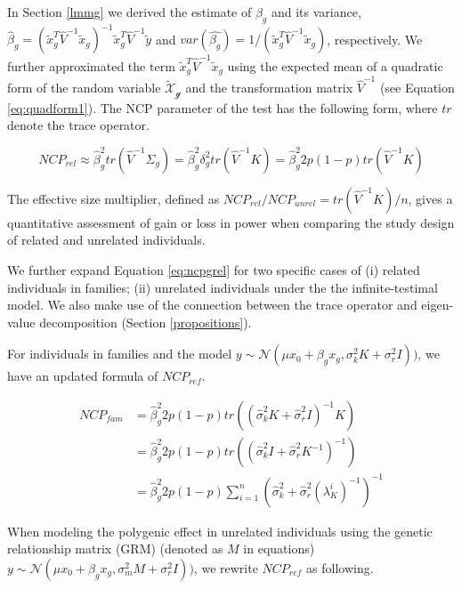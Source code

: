 \documentclass[]{book}
\theoremstyle{definition}
\theoremstyle{definition}
\theoremstyle{definition}
\theoremstyle{remark}
\begin{document}
In Section \ref{lmmg} we derived the estimate of \(\beta_g\) and its
variance,
\(\hat{\beta}_g = (\tilde{x}_g^T \hat{V}^{-1} \tilde{x}_g)^{-1} \tilde{x}_g^T \hat{V}^{-1} \tilde{y}\)
and
\(var(\hat{\beta_g}) = 1 / (\tilde{x}_g^T \hat{V}^{-1} \tilde{x}_g)\),
respectively. We further approximated the term
\(\tilde{x}_g^T \hat{V}^{-1} \tilde{x}_g\) using the expected mean of a
quadratic form of the random variable \(\mathcal{\tilde{X}_g}\) and the
transformation matrix \(\hat{V}^{-1}\) (see Equation
\eqref{eq:quadform1}). The NCP parameter of the test has the following
form, where \(tr\) denote the trace operator.

\begin{equation} 
NCP_{rel} \approx \hat{\beta}_g^2 tr(\hat{V}^{-1} \Sigma_g) = \hat{\beta}_g^2 \delta_g^2 tr(\hat{V}^{-1} K) = \hat{\beta}_g^2 2 p (1 - p) tr(\hat{V}^{-1} K)
\label{eq:ncpgrel}
\end{equation}

The effective size multiplier, defined as
\(NCP_{rel} / NCP_{unrel} = tr(\hat{V}^{-1} K) / n\), gives a
quantitative assessment of gain or loss in power when comparing the
study design of related and unrelated individuals.

We further expand Equation \eqref{eq:ncpgrel} for two specific cases of
(i) related individuals in families; (ii) unrelated individuals under
the the infinite-testimal model. We also make use of the connection
between the trace operator and eigen-value decomposition (Section
\ref{propositions}).

For individuals in families and the model
\(y \sim \mathcal{N} (\mu x_0 + \beta_g x_g, \sigma_k^2 K + \sigma_r^2 I))\),
we have an updated formula of \(NCP_{ref}\).

\begin{equation} 
\begin{split}
NCP_{fam} & = \hat{\beta}_g^2 2 p (1 - p) tr( (\hat{\sigma}_k^2 K + \hat{\sigma}_r^2 I)^{-1} K )  \\
 & = \hat{\beta}_g^2 2 p (1 - p) tr( (\hat{\sigma}_k^2 I + \hat{\sigma}_r^2 K^{-1})^{-1} ) \\
 & = \hat{\beta}_g^2 2 p (1 - p) \sum_{i=1}^{n}{(\hat{\sigma}_k^2 + \hat{\sigma}_r^2 (\lambda_{K}^i)^{-1})^{-1}}
\end{split}
\label{eq:ncpgfam}
\end{equation}

When modeling the polygenic effect in unrelated individuals using the
genetic relationship matrix (GRM) (denoted as \(M\) in equations)
\(y \sim \mathcal{N} (\mu x_0 + \beta_g x_g, \sigma_m^2 M + \sigma_r^2 I))\),
we rewrite \(NCP_{ref}\) as following.
\end{document}
